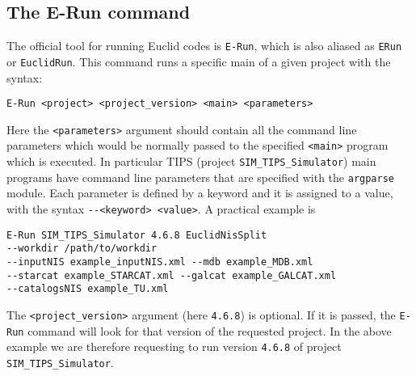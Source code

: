 \subsection{The E-Run command}
The official tool for running Euclid codes is \verb+E-Run+, which is also aliased as \verb+ERun+ or \verb+EuclidRun+. This command runs a specific main of a given project with the syntax:

\begin{center}
\verb+E-Run <project> <project_version> <main> <parameters>+
\end{center}

Here the \verb+<parameters>+ argument should contain all the command line parameters which would be normally passed to the specified \verb+<main>+ program which is executed. In particular TIPS (project \verb+SIM_TIPS_Simulator+) main programs have command line parameters that are specified with the \verb+argparse+ module. Each parameter is defined by a keyword and it is assigned to a value, with the syntax \verb+--<keyword> <value>+. A practical example is

\begin{verbatim}
E-Run SIM_TIPS_Simulator 4.6.8 EuclidNisSplit 
--workdir /path/to/workdir 
--inputNIS example_inputNIS.xml --mdb example_MDB.xml 
--starcat example_STARCAT.xml --galcat example_GALCAT.xml 
--catalogsNIS example_TU.xml
\end{verbatim}

The \verb+<project_version>+ argument (here \verb+4.6.8+) is optional. If it is passed, the \verb+E-Run+ command will look for that version of the requested project. In the above example we are therefore requesting to run version \verb+4.6.8+ of project \verb+SIM_TIPS_Simulator+. 